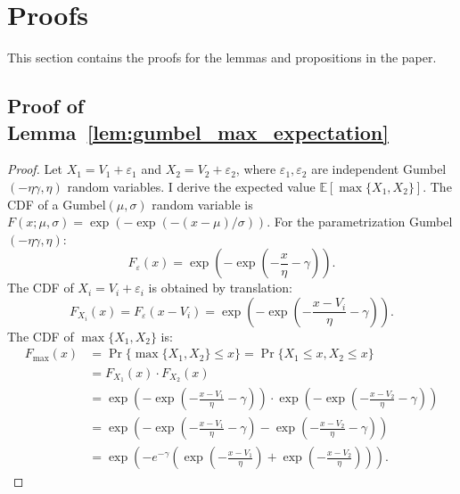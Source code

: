 \documentclass[12pt]{article}
\theoremstyle{plain}
\begin{document}
\section{Proofs}\label{app:proofs}
This section contains the proofs for the lemmas and propositions in the paper.

\subsection{Proof of Lemma~\ref{lem:gumbel_max_expectation}}\label{app:proof_gumbel_max_expectation}

\begin{proof}
	Let $X_1 = V_1 + \varepsilon_1$ and $X_2 = V_2 + \varepsilon_2$, where $\varepsilon_1, \varepsilon_2$ are independent Gumbel$(-\eta\gamma, \eta)$ random variables. I derive the expected value $\mathbb{E}[\max\{X_1, X_2\}]$. The CDF of a Gumbel$(\mu, \sigma)$ random variable is $F(x; \mu, \sigma) =
		\exp(-\exp(-(x - \mu)/\sigma))$. For the parametrization Gumbel$(-\eta\gamma,
		\eta)$:
	\begin{equation*}
		F_\varepsilon(x) = \exp\left(-\exp\left(-\frac{x}{\eta} - \gamma\right)\right).
	\end{equation*}
	The CDF of $X_i = V_i + \varepsilon_i$ is obtained by translation:
	\begin{equation*}
		F_{X_i}(x) = F_\varepsilon(x - V_i) = \exp\left(-\exp\left(-\frac{x - V_i}{\eta} - \gamma\right)\right).
	\end{equation*}
	The CDF of $\max\{X_1, X_2\}$ is:
	\begin{align*}
		F_{\max}(x) & = \Pr\{\max\{X_1, X_2\} \leq x\} = \Pr\{X_1 \leq x, X_2 \leq x\}                                                                            \\
		            & = F_{X_1}(x) \cdot F_{X_2}(x)                                                                                                               \\
		            & = \exp\left(-\exp\left(-\frac{x - V_1}{\eta} - \gamma\right)\right) \cdot \exp\left(-\exp\left(-\frac{x - V_2}{\eta} - \gamma\right)\right) \\
		            & = \exp\left(-\exp\left(-\frac{x - V_1}{\eta} - \gamma\right) - \exp\left(-\frac{x - V_2}{\eta} - \gamma\right)\right)                       \\
		            & = \exp\left(-e^{-\gamma}\left(\exp\left(-\frac{x - V_1}{\eta}\right) + \exp\left(-\frac{x - V_2}{\eta}\right)\right)\right).
	\end{align*}

\end{proof}
\end{document}
